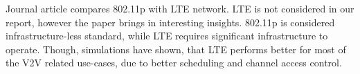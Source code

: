 % 
Journal article \cite{HameedMir2014LTEEvaluation} compares 802.11p with LTE network. LTE is not considered in our report, however the paper brings in interesting insights. 802.11p is considered infrastructure-less standard, while LTE requires significant infrastructure to operate. Though, simulations have shown, that LTE performs better for most of the V2V related use-cases, due to better scheduling and channel access control.